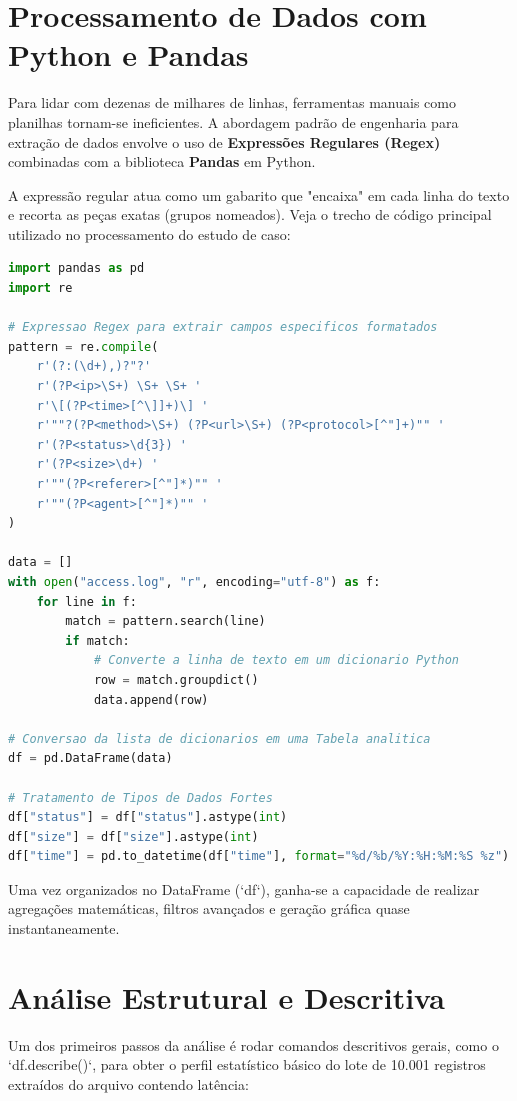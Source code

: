 \documentclass[12pt,a4paper]{report}
\begin{document}
\section{Processamento de Dados com Python e Pandas}

Para lidar com dezenas de milhares de linhas, ferramentas manuais como planilhas tornam-se ineficientes. A abordagem padrão de engenharia para extração de dados envolve o uso de \textbf{Expressões Regulares (Regex)} combinadas com a biblioteca \textbf{Pandas} \cite{mckinney2022} em Python.

A expressão regular atua como um gabarito que "encaixa" em cada linha do texto e recorta as peças exatas (grupos nomeados). Veja o trecho de código principal utilizado no processamento do estudo de caso:

\begin{lstlisting}[language=Python, caption={Extração de dados de log via Regex em Python}]
import pandas as pd
import re

# Expressao Regex para extrair campos especificos formatados
pattern = re.compile(
    r'(?:(\d+),)?"?'
    r'(?P<ip>\S+) \S+ \S+ '
    r'\[(?P<time>[^\]]+)\] '
    r'""?(?P<method>\S+) (?P<url>\S+) (?P<protocol>[^"]+)"" '
    r'(?P<status>\d{3}) '
    r'(?P<size>\d+) '
    r'""(?P<referer>[^"]*)"" '
    r'""(?P<agent>[^"]*)"" '
)

data = []
with open("access.log", "r", encoding="utf-8") as f:
    for line in f:
        match = pattern.search(line)
        if match:
            # Converte a linha de texto em um dicionario Python
            row = match.groupdict()
            data.append(row)

# Conversao da lista de dicionarios em uma Tabela analitica
df = pd.DataFrame(data)

# Tratamento de Tipos de Dados Fortes
df["status"] = df["status"].astype(int)
df["size"] = df["size"].astype(int)
df["time"] = pd.to_datetime(df["time"], format="%d/%b/%Y:%H:%M:%S %z")
\end{lstlisting}

Uma vez organizados no DataFrame (`df`), ganha-se a capacidade de realizar agregações matemáticas, filtros avançados e geração gráfica quase instantaneamente.

\section{Análise Estrutural e Descritiva}

Um dos primeiros passos da análise é rodar comandos descritivos gerais, como o `df.describe()`, para obter o perfil estatístico básico do lote de 10.001 registros extraídos do arquivo contendo latência:
\end{document}
